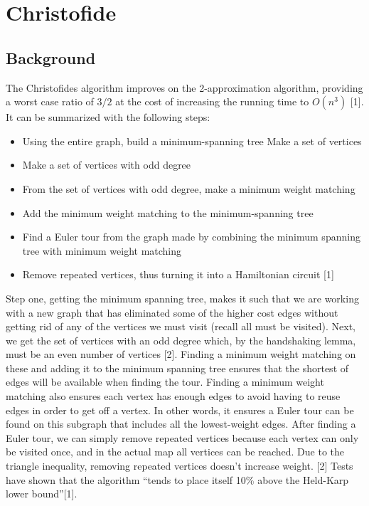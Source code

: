 \documentclass{article}
\begin{document}
\section{Christofide}
\subsection{Background}
The Christofides algorithm improves on the 2-approximation algorithm, providing
a worst case ratio of $3/2$ at the cost of increasing the running time to
$O(n^3)$ [1].\\

It can be summarized with the following steps:
\begin{itemize}
  \item Using the entire graph, build a minimum-spanning tree Make a set of
        vertices
  \item Make a set of vertices with odd degree
  \item From the set of vertices with odd degree, make a minimum weight matching
  \item Add the minimum weight matching to the minimum-spanning tree
  \item Find a Euler tour from the graph made by combining the minimum spanning
        tree with minimum weight matching
  \item Remove repeated vertices, thus turning it into a Hamiltonian circuit [1]
\end{itemize}

Step one, getting the minimum spanning tree, makes it such that we are working
with a new graph that has eliminated some of the higher cost edges without
getting rid of any of the vertices we must visit (recall all must be visited).
Next, we get the set of vertices with an odd degree which, by the handshaking
lemma, must be an even number of vertices [2]. Finding a minimum weight matching
on these and adding it to the minimum spanning tree ensures that the shortest
of edges will be available when finding the tour. Finding a minimum weight
matching also ensures each vertex has enough edges to avoid having to reuse
edges in order to get off a vertex. In other words, it ensures a Euler tour
can be found on this subgraph that includes all the lowest-weight edges. After
finding a Euler tour, we can simply remove repeated vertices because each vertex
can only be visited once, and in the actual map all vertices can be reached. Due
to the triangle inequality, removing repeated vertices doesn’t increase weight.
[2] Tests have shown that the algorithm “tends to place itself 10\% above the
Held-Karp lower bound”[1].\\
\end{document}
